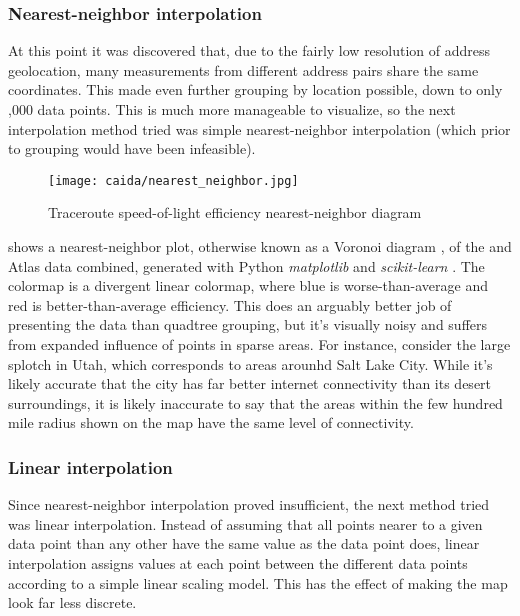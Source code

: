 \subsubsection{Nearest-neighbor interpolation}

At this point it was discovered that, due to the fairly low resolution of \ip address geolocation, many measurements from different \ip address pairs share the same coordinates. This made even further grouping by location possible, down to only ,000 data points. This is much more manageable to visualize, so the next interpolation method tried was simple nearest-neighbor interpolation (which prior to grouping would have been infeasible).

\begin{figure}[h]
    \centering
    \texttt{[image: caida/nearest\_neighbor.jpg]}
    \caption{Traceroute speed-of-light efficiency nearest-neighbor diagram}
    \label{fig:caida_nearest_neighbor}
\end{figure}

 shows a nearest-neighbor plot, otherwise known as a Voronoi diagram \cite{Malhotra2017a}, of the \caida and \ripe Atlas data combined, generated with Python \textit{matplotlib} and \textit{scikit-learn} \cite{scipy, matplotlib}. The colormap is a divergent linear colormap, where blue is worse-than-average and red is better-than-average efficiency. This does an arguably better job of presenting the data than quadtree grouping, but it's visually noisy and suffers from expanded influence of points in sparse areas. For instance, consider the large splotch in Utah, which corresponds to areas arounhd Salt Lake City. While it's likely accurate that the city has far better internet connectivity than its desert surroundings, it is likely inaccurate to say that the areas within the few hundred mile radius shown on the map have the same level of connectivity.

\subsubsection{Linear interpolation}

Since nearest-neighbor interpolation proved insufficient, the next method tried was linear interpolation. Instead of assuming that all points nearer to a given data point than any other have the same value as the data point does, linear interpolation assigns values at each point between the different data points according to a simple linear scaling model. This has the effect of making the map look far less discrete.

